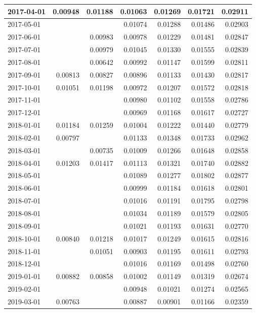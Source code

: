 \documentclass[
]{book}
\begin{document}
\begin{table}
\begin{tabular}[t]{l|r|r|r|r|r|r}
\hline
2017-04-01 & 0.00948 & 0.01188 & 0.01063 & 0.01269 & 0.01721 & 0.02911\\
\hline
2017-05-01 &  &  & 0.01074 & 0.01288 & 0.01486 & 0.02903\\
\hline
2017-06-01 &  & 0.00983 & 0.00978 & 0.01229 & 0.01481 & 0.02847\\
\hline
2017-07-01 &  & 0.00979 & 0.01045 & 0.01330 & 0.01555 & 0.02839\\
\hline
2017-08-01 &  & 0.00642 & 0.00992 & 0.01147 & 0.01599 & 0.02811\\
\hline
2017-09-01 & 0.00813 & 0.00827 & 0.00896 & 0.01133 & 0.01430 & 0.02817\\
\hline
2017-10-01 & 0.01051 & 0.01198 & 0.00972 & 0.01207 & 0.01572 & 0.02818\\
\hline
2017-11-01 &  &  & 0.00980 & 0.01102 & 0.01558 & 0.02786\\
\hline
2017-12-01 &  &  & 0.00969 & 0.01168 & 0.01617 & 0.02727\\
\hline
2018-01-01 & 0.01184 & 0.01259 & 0.01004 & 0.01222 & 0.01440 & 0.02779\\
\hline
2018-02-01 & 0.00797 &  & 0.01133 & 0.01348 & 0.01733 & 0.02962\\
\hline
2018-03-01 &  & 0.00735 & 0.01009 & 0.01266 & 0.01648 & 0.02858\\
\hline
2018-04-01 & 0.01203 & 0.01417 & 0.01113 & 0.01321 & 0.01740 & 0.02882\\
\hline
2018-05-01 &  &  & 0.01089 & 0.01277 & 0.01802 & 0.02877\\
\hline
2018-06-01 &  &  & 0.00999 & 0.01184 & 0.01618 & 0.02801\\
\hline
2018-07-01 &  &  & 0.01016 & 0.01191 & 0.01795 & 0.02798\\
\hline
2018-08-01 &  &  & 0.01034 & 0.01189 & 0.01579 & 0.02805\\
\hline
2018-09-01 &  &  & 0.01021 & 0.01193 & 0.01631 & 0.02770\\
\hline
2018-10-01 & 0.00840 & 0.01218 & 0.01017 & 0.01249 & 0.01615 & 0.02816\\
\hline
2018-11-01 &  & 0.01051 & 0.00903 & 0.01195 & 0.01611 & 0.02793\\
\hline
2018-12-01 &  &  & 0.01016 & 0.01169 & 0.01498 & 0.02760\\
\hline
2019-01-01 & 0.00882 & 0.00858 & 0.01002 & 0.01149 & 0.01319 & 0.02674\\
\hline
2019-02-01 &  &  & 0.00948 & 0.01021 & 0.01274 & 0.02565\\
\hline
2019-03-01 & 0.00763 &  & 0.00887 & 0.00901 & 0.01166 & 0.02359\\

\end{tabular}
\end{table}
\end{document}
